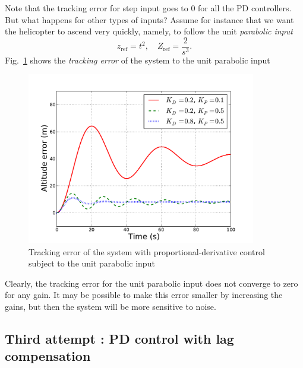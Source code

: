 \documentclass[a4paper,11pt]{report}
\theoremstyle{definition}
\newcommand{\re}{\mathrm{ref}}
\begin{document}
Note that the tracking error for step input goes to 0 for all the PD
controllers. But what happens for other types of inputs? Assume for
instance that we want the helicopter to ascend very quickly, namely,
to follow the unit \emph{parabolic input}
\[
z_\re = t^2, \quad Z_\re = \frac{2}{s^3}.
\]
Fig.~\ref{fig:paraberr} shows the \emph{tracking error}  of the system to the
unit parabolic input
\begin{figure}[H]
  \centering
  \includegraphics[width=10cm]{fig/paraberr.pdf}
  \caption{Tracking error of the system with proportional-derivative
    control subject to the unit parabolic input}
  \label{fig:paraberr}
\end{figure}

Clearly, the tracking error for the unit parabolic input does not
converge to zero for any gain. It may be possible to make this error
smaller by increasing the gains, but then the system will be more
sensitive to noise.

\subsection{Third attempt : PD control with lag compensation}
\end{document}
